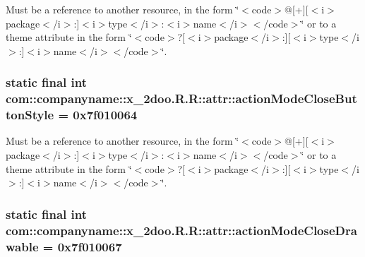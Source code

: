Must be a reference to another resource, in the form \char`\"{}$<$code$>$@\mbox{[}+\mbox{]}\mbox{[}$<$i$>$package$<$/i$>$:\mbox{]}$<$i$>$type$<$/i$>$:$<$i$>$name$<$/i$>$$<$/code$>$\char`\"{} or to a theme attribute in the form \char`\"{}$<$code$>$?\mbox{[}$<$i$>$package$<$/i$>$:\mbox{]}\mbox{[}$<$i$>$type$<$/i$>$:\mbox{]}$<$i$>$name$<$/i$>$$<$/code$>$\char`\"{}. \hypertarget{classcom_1_1companyname_1_1x__2doo_1_1_r_1_1attr_6666201c773ccc12e7bf6a567093ac2b}{
\subsubsection[{actionModeCloseButtonStyle}]{\setlength{\rightskip}{0pt plus 5cm}static final int com::companyname::x\_\-2doo.R.R::attr::actionModeCloseButtonStyle = 0x7f010064}}
\label{classcom_1_1companyname_1_1x__2doo_1_1_r_1_1attr_6666201c773ccc12e7bf6a567093ac2b}


Must be a reference to another resource, in the form \char`\"{}$<$code$>$@\mbox{[}+\mbox{]}\mbox{[}$<$i$>$package$<$/i$>$:\mbox{]}$<$i$>$type$<$/i$>$:$<$i$>$name$<$/i$>$$<$/code$>$\char`\"{} or to a theme attribute in the form \char`\"{}$<$code$>$?\mbox{[}$<$i$>$package$<$/i$>$:\mbox{]}\mbox{[}$<$i$>$type$<$/i$>$:\mbox{]}$<$i$>$name$<$/i$>$$<$/code$>$\char`\"{}. \hypertarget{classcom_1_1companyname_1_1x__2doo_1_1_r_1_1attr_c9f4cb83c9e5be6f730b3dd34a9c04ad}{
\subsubsection[{actionModeCloseDrawable}]{\setlength{\rightskip}{0pt plus 5cm}static final int com::companyname::x\_\-2doo.R.R::attr::actionModeCloseDrawable = 0x7f010067}}
\label{classcom_1_1companyname_1_1x__2doo_1_1_r_1_1attr_c9f4cb83c9e5be6f730b3dd34a9c04ad}


